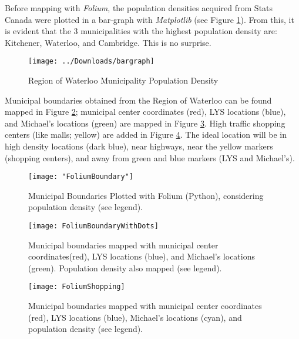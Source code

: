 \documentclass[10pt,a4paper]{report}
\begin{document}
	\noindent Before mapping with \textit{Folium}, the population densities acquired from Stats Canada were plotted in a bar-graph with \textit{Matplotlib} (see Figure \ref{fig:bargraph}). From this, it is evident that the 3 municipalities with the highest population density are: Kitchener, Waterloo, and Cambridge. This is no surprise.\\
	
	
	\begin{figure}[h!]
		\centering
		\texttt{[image: ../Downloads/bargraph]}
		\caption{Region of Waterloo Municipality Population Density}
		\label{fig:bargraph}
	\end{figure}

	 \noindent Municipal boundaries obtained from the Region of Waterloo can be found mapped in Figure \ref{fig:screen-shot-2019-10-15-at-2}; municipal center coordinates (red), LYS locations (blue), and Michael's locations (green) are mapped in Figure \ref{fig:foliumboundarywithdots}. High traffic shopping centers (like malls; yellow) are added in Figure \ref{fig:foliumshopping}. The ideal location will be in high density locations (dark blue), near highways, near the yellow markers (shopping centers), and away from green and blue markers (LYS and Michael's). 

\begin{figure}[h!]
	\centering
	\texttt{[image: "FoliumBoundary"]}
	\caption{Municipal Boundaries Plotted with Folium (Python), considering population density (see legend). }
	\label{fig:screen-shot-2019-10-15-at-2}
\end{figure}

	\begin{figure}
		\centering
		\texttt{[image: FoliumBoundaryWithDots]}
		\caption{Municipal boundaries mapped with municipal center coordinates(red), LYS locations (blue), and Michael's locations (green). Population density also mapped (see legend).}
		\label{fig:foliumboundarywithdots}
	\end{figure}
	
	\begin{figure}
		\centering
		\texttt{[image: FoliumShopping]}
		\caption{Municipal boundaries mapped with municipal center coordinates (red), LYS locations (blue), Michael's locations (cyan), and population density (see legend).}
		\label{fig:foliumshopping}
	\end{figure}
\end{document}
